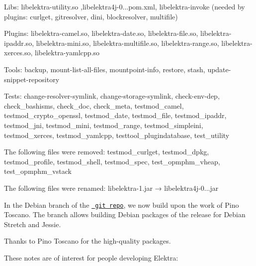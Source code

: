 \begin{DoxyItemize}
\item Libs\+: {\ttfamily libelektra-\/utility.\+so} ,{\ttfamily libelektra4j-\/0...\+pom.\+xml}, {\ttfamily libelektra-\/invoke} (needed by plugins\+: curlget, gitresolver, dini, blockresolver, multifile)
\item Plugins\+: {\ttfamily libelektra-\/camel.\+so}, {\ttfamily libelektra-\/date.\+so}, {\ttfamily libelektra-\/file.\+so}, {\ttfamily libelektra-\/ipaddr.\+so}, {\ttfamily libelektra-\/mini.\+so}, {\ttfamily libelektra-\/multifile.\+so}, {\ttfamily libelektra-\/range.\+so}, {\ttfamily libelektra-\/xerces.\+so}, {\ttfamily libelektra-\/yamlcpp.\+so}
\item Tools\+: {\ttfamily backup}, {\ttfamily mount-\/list-\/all-\/files}, {\ttfamily mountpoint-\/info}, {\ttfamily restore}, {\ttfamily stash}, {\ttfamily update-\/snippet-\/repository}
\item Tests\+: {\ttfamily change-\/resolver-\/symlink}, {\ttfamily change-\/storage-\/symlink}, {\ttfamily check-\/env-\/dep}, {\ttfamily check\+\_\+bashisms}, {\ttfamily check\+\_\+doc}, {\ttfamily check\+\_\+meta}, {\ttfamily testmod\+\_\+camel}, {\ttfamily testmod\+\_\+crypto\+\_\+openssl}, {\ttfamily testmod\+\_\+date}, {\ttfamily testmod\+\_\+file}, {\ttfamily testmod\+\_\+ipaddr}, {\ttfamily testmod\+\_\+jni}, {\ttfamily testmod\+\_\+mini}, {\ttfamily testmod\+\_\+range}, {\ttfamily testmod\+\_\+simpleini}, {\ttfamily testmod\+\_\+xerces}, {\ttfamily testmod\+\_\+yamlcpp}, {\ttfamily testtool\+\_\+plugindatabase}, {\ttfamily test\+\_\+utility}
\end{DoxyItemize}

The following files were removed\+: {\ttfamily testmod\+\_\+curlget}, {\ttfamily testmod\+\_\+dpkg}, {\ttfamily testmod\+\_\+profile}, {\ttfamily testmod\+\_\+shell}, {\ttfamily testmod\+\_\+spec}, {\ttfamily test\+\_\+opmphm\+\_\+vheap}, {\ttfamily test\+\_\+opmphm\+\_\+vstack}

The following files were renamed\+: {\ttfamily libelektra-\/1.\+jar} → {\ttfamily libelektra4j-\/0...\+jar}

In the Debian branch of the \href{https://git.libelektra.org/tree/debian}{\texttt{ git repo}}, we now build upon the work of Pino Toscano. The branch allows building Debian packages of the release for Debian Stretch and Jessie.

Thanks to Pino Toscano for the high-\/quality packages.

These notes are of interest for people developing Elektra\+:


